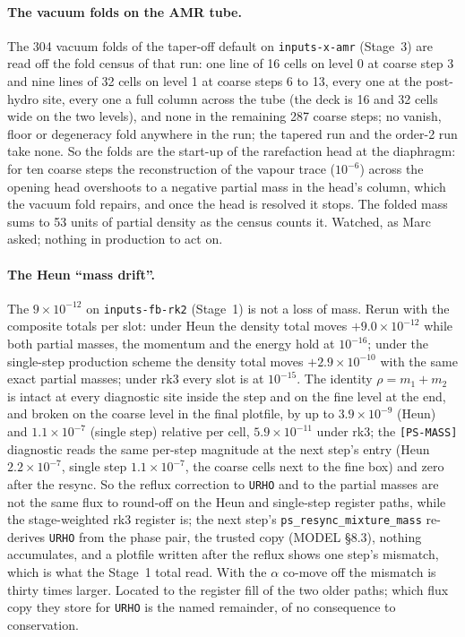\documentclass[11pt,a4paper]{article}
\newcommand{\code}[1]{\texttt{\small #1}}
\begin{document}
\paragraph{The vacuum folds on the AMR tube.}  The 304 vacuum folds of
the taper-off default on \code{inputs-x-amr} (Stage~3) are read off the
fold census of that run: one line of 16 cells on level 0 at coarse step
3 and nine lines of 32 cells on level 1 at coarse steps 6 to 13, every
one at the post-hydro site, every one a full column across the tube
(the deck is 16 and 32 cells wide on the two levels), and none in the
remaining 287 coarse steps; no vanish, floor or degeneracy fold anywhere
in the run; the tapered run and the order-2 run take none.  So the
folds are the start-up of the rarefaction head at the diaphragm: for
ten coarse steps the reconstruction of the vapour trace ($10^{-6}$)
across the opening head overshoots to a negative partial mass in the
head's column, which the vacuum fold repairs, and once the head is
resolved it stops.  The folded mass sums to 53 units of partial density
as the census counts it.  Watched, as Marc asked; nothing in production
to act on.

\paragraph{The Heun ``mass drift''.}  The $9\times10^{-12}$ on
\code{inputs-fb-rk2} (Stage~1) is not a loss of mass.  Rerun with the
composite totals per slot: under Heun the density total moves
$+9.0\times10^{-12}$ while both partial masses, the momentum and the
energy hold at $10^{-16}$; under the single-step production scheme the
density total moves $+2.9\times10^{-10}$ with the same exact partial
masses; under rk3 every slot is at $10^{-15}$.  The identity
$\rho = m_1 + m_2$ is intact at every diagnostic site inside the step
and on the fine level at the end, and broken on the coarse level in
the final plotfile, by up to $3.9\times10^{-9}$ (Heun) and
$1.1\times10^{-7}$ (single step) relative per cell, $5.9\times10^{-11}$
under rk3; the \code{[PS-MASS]} diagnostic reads the same per-step
magnitude at the next step's entry (Heun $2.2\times10^{-7}$, single
step $1.1\times10^{-7}$, the coarse cells next to the fine box) and
zero after the resync.  So the reflux correction to \code{URHO} and to
the partial masses are not the same flux to round-off on the Heun and
single-step register paths, while the stage-weighted rk3 register is;
the next step's \code{ps\_resync\_mixture\_mass} re-derives \code{URHO}
from the phase pair, the trusted copy (MODEL \S8.3), nothing
accumulates, and a plotfile written after the reflux shows one step's
mismatch, which is what the Stage~1 total read.  With the $\alpha$
co-move off the mismatch is thirty times larger.  Located to the
register fill of the two older paths; which flux copy they store for
\code{URHO} is the named remainder, of no consequence to conservation.
\end{document}
